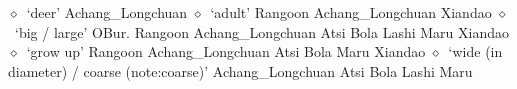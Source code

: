          $\diamond$~`deer'
         Achang\_Longchuan 
\hspace{1ex}
         $\diamond$~`adult'
         Rangoon 
\hspace{1ex}
         Achang\_Longchuan 
\hspace{1ex}
         Xiandao 
\hspace{1ex}
         $\diamond$~`big / large'
         OBur. 
\hspace{1ex}
         Rangoon 
\hspace{1ex}
         Achang\_Longchuan 
\hspace{1ex}
         Atsi 
\hspace{1ex}
         Bola 
\hspace{1ex}
         Lashi 
\hspace{1ex}
         Maru 
\hspace{1ex}
         Xiandao 
\hspace{1ex}
         $\diamond$~`grow up'
         Rangoon 
\hspace{1ex}
         Achang\_Longchuan 
\hspace{1ex}
         Atsi 
\hspace{1ex}
         Bola 
\hspace{1ex}
         Maru 
\hspace{1ex}
         Xiandao 
\hspace{1ex}
         $\diamond$~`wide (in diameter) / coarse (note:coarse)'
         Achang\_Longchuan 
\hspace{1ex}
         Atsi 
\hspace{1ex}
         Bola 
\hspace{1ex}
         Lashi 
\hspace{1ex}
         Maru 
